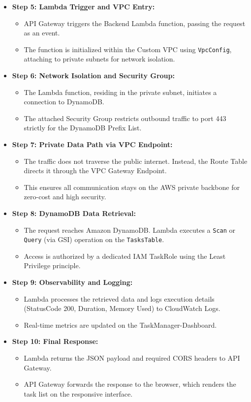 \begin{itemize}
  \item \textbf{Step 5: Lambda Trigger and VPC Entry:}
  \begin{itemize}
    \item API Gateway triggers the Backend Lambda function, passing the request as an event.
    \item The function is initialized within the Custom VPC using \texttt{VpcConfig}, attaching to private subnets for network isolation.
  \end{itemize}
  \item \textbf{Step 6: Network Isolation and Security Group:}
  \begin{itemize}
    \item The Lambda function, residing in the private subnet, initiates a connection to DynamoDB.
    \item The attached Security Group restricts outbound traffic to port 443 strictly for the DynamoDB Prefix List.
  \end{itemize}
  \item \textbf{Step 7: Private Data Path via VPC Endpoint:}
  \begin{itemize}
    \item The traffic does not traverse the public internet. Instead, the Route Table directs it through the VPC Gateway Endpoint.
    \item This ensures all communication stays on the AWS private backbone for zero-cost and high security.
  \end{itemize}
  \item \textbf{Step 8: DynamoDB Data Retrieval:}
  \begin{itemize}
    \item The request reaches Amazon DynamoDB. Lambda executes a \texttt{Scan} or \texttt{Query} (via GSI) operation on the \texttt{TasksTable}.
    \item Access is authorized by a dedicated IAM TaskRole using the Least Privilege principle.
  \end{itemize}
  \item \textbf{Step 9: Observability and Logging:}
  \begin{itemize}
    \item Lambda processes the retrieved data and logs execution details (StatusCode 200, Duration, Memory Used) to CloudWatch Logs.
    \item Real-time metrics are updated on the TaskManager-Dashboard.
  \end{itemize}
  \item \textbf{Step 10: Final Response:}
  \begin{itemize}
    \item Lambda returns the JSON payload and required CORS headers to API Gateway.
    \item API Gateway forwards the response to the browser, which renders the task list on the responsive interface.
  \end{itemize}
\end{itemize}

